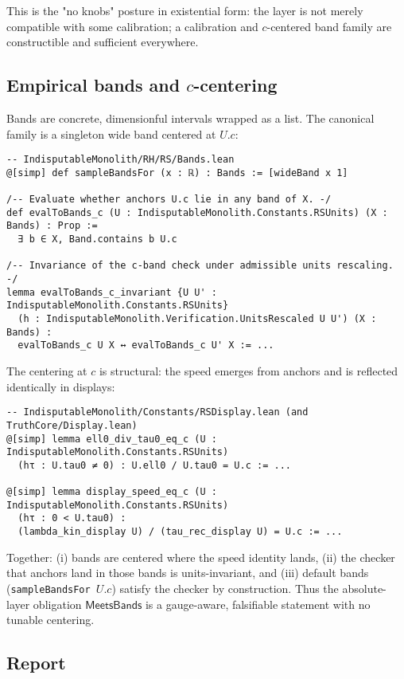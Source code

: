 \documentclass[11pt,a4paper,twoside]{article}
\numberwithin{equation}{section}
\theoremstyle{customthm}
\theoremstyle{customdef}
\theoremstyle{customrem}
\begin{document}
\noindent This is the "no knobs" posture in existential form: the layer is not merely compatible with some calibration; a calibration and \(c\)-centered band family are constructible and sufficient everywhere.

\subsection{Empirical bands and \(c\)-centering}

\noindent Bands are concrete, dimensionful intervals wrapped as a list. The canonical family is a singleton wide band centered at \(U.c\):
\begin{lstlisting}
-- IndisputableMonolith/RH/RS/Bands.lean
@[simp] def sampleBandsFor (x : ℝ) : Bands := [wideBand x 1]

/-- Evaluate whether anchors U.c lie in any band of X. -/
def evalToBands_c (U : IndisputableMonolith.Constants.RSUnits) (X : Bands) : Prop :=
  ∃ b ∈ X, Band.contains b U.c

/-- Invariance of the c-band check under admissible units rescaling. -/
lemma evalToBands_c_invariant {U U' : IndisputableMonolith.Constants.RSUnits}
  (h : IndisputableMonolith.Verification.UnitsRescaled U U') (X : Bands) :
  evalToBands_c U X ↔ evalToBands_c U' X := ...
\end{lstlisting}

\noindent The centering at \(c\) is structural: the speed emerges from anchors and is reflected identically in displays:
\begin{lstlisting}
-- IndisputableMonolith/Constants/RSDisplay.lean (and TruthCore/Display.lean)
@[simp] lemma ell0_div_tau0_eq_c (U : IndisputableMonolith.Constants.RSUnits)
  (hτ : U.tau0 ≠ 0) : U.ell0 / U.tau0 = U.c := ...

@[simp] lemma display_speed_eq_c (U : IndisputableMonolith.Constants.RSUnits)
  (hτ : 0 < U.tau0) :
  (lambda_kin_display U) / (tau_rec_display U) = U.c := ...
\end{lstlisting}

\noindent Together: (i) bands are centered where the speed identity lands, (ii) the checker that anchors land in those bands is units-invariant, and (iii) default bands (\texttt{sampleBandsFor \(U.c\)}) satisfy the checker by construction. Thus the absolute-layer obligation \(\mathsf{MeetsBands}\) is a gauge-aware, falsifiable statement with no tunable centering.

\subsection{Report}
\end{document}
